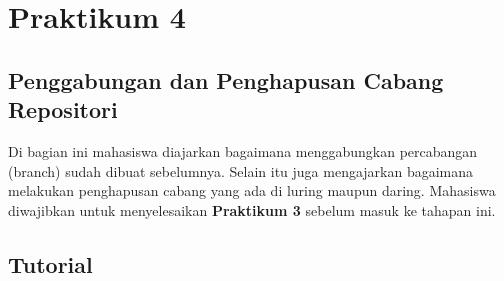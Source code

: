 \documentclass[a4paper, 12pt]{report}
\begin{document}
  	
  	\chapter{Praktikum 4}
  	\section{Penggabungan dan Penghapusan Cabang Repositori}
  	Di bagian ini mahasiswa diajarkan bagaimana menggabungkan percabangan (branch) sudah dibuat sebelumnya. Selain itu juga mengajarkan bagaimana melakukan penghapusan cabang yang ada di luring maupun daring. Mahasiswa diwajibkan untuk menyelesaikan \textbf{Praktikum 3} sebelum masuk ke tahapan ini.
  	
  	\section{Tutorial}
\end{document}
